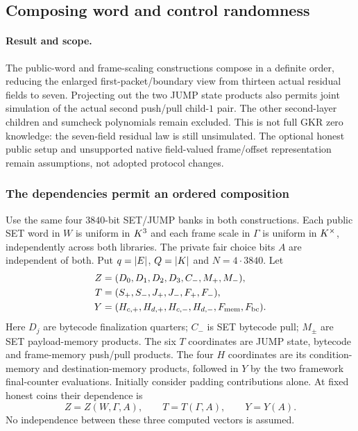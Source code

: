 \subsection{Composing word and control randomness}\label{note:zk-control-composition}

\paragraph{Result and scope.} The public-word and frame-scaling constructions compose in a definite order, reducing the enlarged first-packet/boundary view from thirteen actual residual fields to seven. Projecting out the two JUMP state products also permits joint simulation of the actual second push/pull child-$1$ pair. The other second-layer children and sumcheck polynomials remain excluded. This is not full GKR zero knowledge: the seven-field residual law is still unsimulated. The optional honest public setup and unsupported native field-valued frame/offset representation remain assumptions, not adopted protocol changes.

\subsubsection{The dependencies permit an ordered composition}

Use the same four $3840$-bit SET/JUMP banks in both constructions. Each public SET word in $W$ is uniform in $K^3$ and each frame scale in $\Gamma$ is uniform in $K^\times$, independently across both libraries. The private fair choice bits $A$ are independent of both. Put $q=|E|$, $Q=|K|$ and $N=4\cdot3840$. Let
\[
\begin{aligned}
 Z&=(D_0,D_1,D_2,D_3,C_-,M_+,M_-),\\
 T&=(S_+,S_-,J_+,J_-,F_+,F_-),\\
 Y&=(H_{c,+},H_{d,+},H_{c,-},H_{d,-},F_{\rm mem},F_{\rm bc}).
\end{aligned}
\]
Here $D_j$ are bytecode finalization quarters; $C_-$ is SET bytecode pull; $M_\pm$ are SET payload-memory products. The six $T$ coordinates are JUMP state, bytecode and frame-memory push/pull products. The four $H$ coordinates are its condition-memory and destination-memory products, followed in $Y$ by the two framework final-counter evaluations. Initially consider padding contributions alone. At fixed honest coins their dependence is
\[
 Z=Z(W,\Gamma,A),\qquad T=T(\Gamma,A),\qquad Y=Y(A).
\]
No independence between these three computed vectors is assumed.

